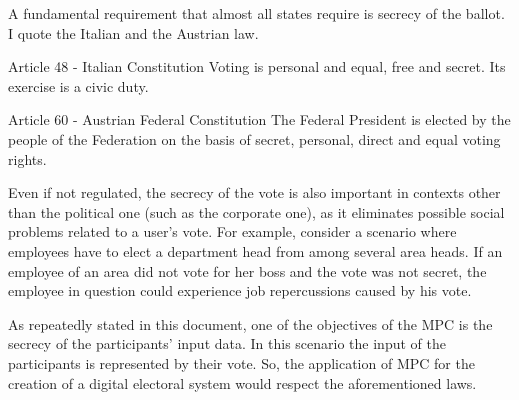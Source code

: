 \documentclass[12pt]{article}
\begin{document}
A fundamental requirement that almost all states require is secrecy of the ballot. I quote the Italian and the Austrian law.
\begin{commentbox}{Article 48 - Italian Constitution}
Voting is personal and equal, free and secret. Its exercise is a civic duty.
\end{commentbox}

\begin{commentbox}{Article 60 - Austrian Federal Constitution}
The Federal President is elected by the people of the Federation on the basis of secret, personal, direct and equal voting rights.
\end{commentbox}

Even if not regulated, the secrecy of the vote is also important in contexts other than the political one (such as the corporate one), as it eliminates possible social problems related to a user's vote. For example, consider a scenario where employees have to elect a department head from among several area heads. If an employee of an area did not vote for her boss and the vote was not secret, the employee in question could experience job repercussions caused by his vote.

As repeatedly stated in this document, one of the objectives of the MPC is the secrecy of the participants' input data. In this scenario the input of the participants is represented by their vote. So, the application of MPC for the creation of a digital electoral system would respect the aforementioned laws.

\end{document}
